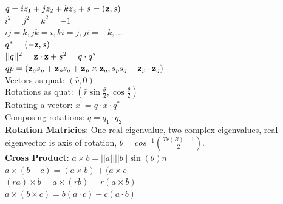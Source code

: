 \documentclass[3pt,landscape]{article}
\begin{document}
\begin{multicols}{3}
\(q=iz_1+jz_2+kz_3+s=({\bf z},s)\)\\
\(i^2=j^2=k^2=-1\)\\
\(ij=k, jk=i, ki=j, ji=-k, ...\)\\
\(q^{*}=({\bf -z},s)\)\\
\(||q||^2={{\bf z}\cdot {\bf z}}+s^2=q\cdot q^{*}\)\\
\(qp=({\bf z}_qs_p+{\bf z}_ps_q+{\bf z}_p\times {\bf z}_q,s_ps_q-{\bf z}_p\cdot {\bf z}_q)\)\\
Vectors as quat: \((\hat{v},0)\)\\
Rotations as quat: \((\hat{r}\sin\frac{\theta}{2},\cos\frac{\theta}{2})\)\\
Rotating a vector: \(x^{'}=q\cdot x\cdot q^{*}\)\\
Composing rotations: \(q=q_1\cdot q_2\)\\
{\bf Rotation Matricies}: One real eigenvalue, two complex eigenvalues, real eigenvector is axis of rotation, \(\theta=cos^{-1}(\frac{Tr(R)-1}{2})\).\\
{\bf Cross Product}: \(a\times b = ||a||||b||\sin(\theta)n\)\\
\(a\times(b+c)=(a\times b) + (a\times c\)\\
\((ra)\times b = a\times(rb)=r(a\times b )\)\\
\(a\times (b\times c)=b(a\cdot c) - c(a\cdot b)\)\\


\end{multicols}
\end{document}
